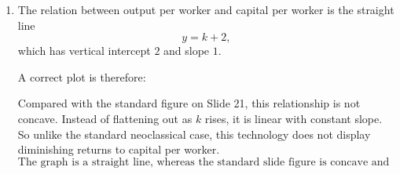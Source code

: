 \documentclass[12pt]{article}
\begin{document}
\begin{enumerate}[label=(\alph*)]
    \item
    The relation between output per worker and capital per worker is the straight line
    \[
    y=k+2,
    \]
    which has vertical intercept \(2\) and slope \(1\).

    A correct plot is therefore:

    \begin{center}
    \end{center}

    Compared with the standard figure on Slide 21, this relationship is not concave. Instead of flattening out as \(k\) rises, it is linear with constant slope. So unlike the standard neoclassical case, this technology does not display diminishing returns to capital per worker.
    \[
    \boxed{\text{The graph is a straight line, whereas the standard slide figure is concave and flattening.}}
    \]
\end{enumerate}
\end{document}
